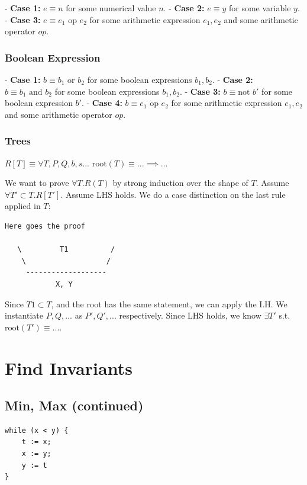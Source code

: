\documentclass{article}
\begin{document}
- \textbf{Case 1:} $e \equiv n$ for some numerical value $n$.
- \textbf{Case 2:} $e \equiv y$ for some variable $y$.
- \textbf{Case 3:} $e \equiv e_1 \text{ op } e_2$ for some arithmetic expression $e_1, e_2$ and some arithmetic operator $op$.

\subsubsection{Boolean Expression}

- \textbf{Case 1:} $b \equiv b_1 \text{ or } b_2$ for some boolean expressions $b_1, b_2$.
- \textbf{Case 2:} $b \equiv b_1 \text{ and } b_2$ for some boolean expressions $b_1, b_2$.
- \textbf{Case 3:} $b \equiv \text{not } b'$ for some boolean expression $b'$.
- \textbf{Case 4:} $b \equiv e_1 \text{ op } e_2$ for some arithmetic expression $e_1, e_2$ and some arithmetic operator $op$.

\subsubsection{Trees}

$R[T] \equiv \forall T, P, Q, b, s... \text{ root}(T) \equiv ... \implies ...$

We want to prove $\forall T.R(T)$ by strong induction over the shape of $T$. Assume $\forall T' \subset T.R[T']$. Assume LHS holds. We do a case distinction on the last rule applied in $T$:

\begin{verbatim}
Here goes the proof

   \         T1          /
    \                   /
     -------------------
            X, Y
\end{verbatim}

Since $T1 \subset T$, and the root has the same statement, we can apply the I.H. We instantiate $P, Q,...$ as $P', Q',...$ respectively. Since LHS holds, we know $\exists T'$ s.t. $\text{root}(T') \equiv ...$.

\section{Find Invariants}

\subsection{Min, Max (continued)}

\begin{lstlisting}[style=mystyle, caption=Haskell Code, label=code:haskell]
    while (x < y) {
    t := x; 
    x := y;
    y := t
}
\end{lstlisting}
\end{document}
